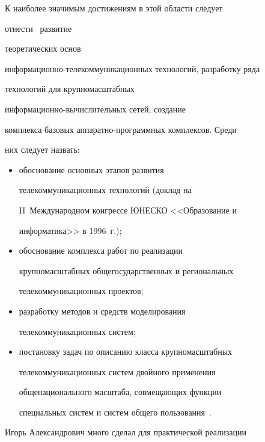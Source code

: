    

   К наиболее значимым достижениям в этой области следует  

отнести~\cite{1-sok, 6-sok, 7-sok, 8-sok, 9-sok, 10-sok} развитие 

теоретических основ  

информационно-телекоммуникационных технологий, разработку ряда 

технологий для крупномасштабных  

ин\-фор\-ма\-ци\-он\-но-вы\-чис\-ли\-тель\-ных сетей, создание 

комплекса базовых ап\-па\-рат\-но-про\-граммных комплексов. Среди 

них следует назвать: 



  



\noindent

\begin{itemize}

\item обоснование основных этапов развития 

телекоммуникационных технологий (доклад на 

II~Международном конгрессе ЮНЕСКО <<Образование и 

информатика>> в 1996~г.);

\item обоснование комплекса работ по реализации 

крупномасштабных общегосударственных и региональных 

телекоммуникационных проектов;

\item разработку методов и средств моделирования 

телекоммуникационных систем;

\item постановку задач по описанию класса крупномасштабных 

телекоммуникационных систем двойного применения 

общенационального масштаба, совмещающих функции 

специальных систем и систем общего пользования~\cite{8-sok, 9-sok, 11-sok}.

\end{itemize}



 

  Игорь Александрович  много сделал для практической реализации 

